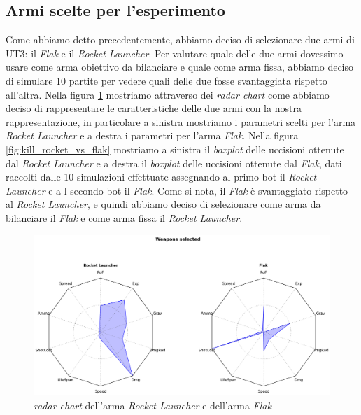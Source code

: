 \documentclass[12pt, italian]{toptesi}
\begin{document}
\subsection{Armi scelte per l'esperimento}
Come abbiamo detto precedentemente, abbiamo deciso di selezionare due armi di UT3: il \emph{Flak} e il \emph{Rocket Launcher}.
Per valutare quale delle due armi dovessimo usare come arma obiettivo da bilanciare e quale come arma fissa, abbiamo deciso di simulare 10 partite per vedere quali delle due fosse svantaggiata rispetto all'altra.
Nella figura \ref{fig:flak_vs_rocket} mostriamo attraverso dei \emph{radar chart} come abbiamo deciso di rappresentare le caratteristiche delle due armi con la nostra rappresentazione, in particolare a sinistra mostriamo i parametri scelti per l'arma \emph{Rocket Launcher} e a destra i parametri per l'arma \emph{Flak}.
Nella figura \ref{fig:kill_rocket_vs_flak} mostriamo a sinistra il \emph{boxplot} delle uccisioni ottenute dal \emph{Rocket Launcher} e a destra il \emph{boxplot} delle uccisioni ottenute dal \emph{Flak}, dati raccolti dalle 10 simulazioni effettuate assegnando al primo bot il \emph{Rocket Launcher} e a l secondo bot il \emph{Flak}. Come si nota, il \emph{Flak} è svantaggiato rispetto al \emph{Rocket Launcher}, e quindi abbiamo deciso di selezionare come arma da bilanciare il \emph{Flak} e come arma fissa il \emph{Rocket Launcher}.

\begin{figure}[htp]
\centering
\includegraphics[width=1.0\textwidth]{flak_vs_rocket}
\caption{\emph{radar chart} dell'arma \emph{Rocket Launcher} e dell'arma \emph{Flak}}
\label{fig:flak_vs_rocket}
\end{figure}
\end{document}
